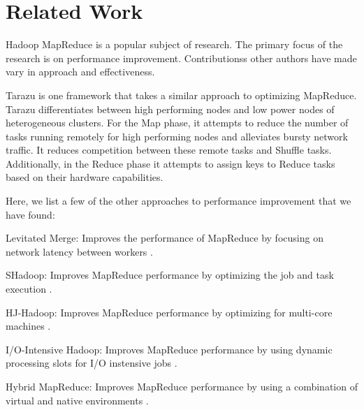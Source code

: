 \section{Related Work}
\label{section:relatedwork}
Hadoop MapReduce is a popular subject of research. The primary focus of the research
is on performance improvement. Contributionss other authors have made vary in
approach and effectiveness.

Tarazu is one framework that takes a similar approach to optimizing MapReduce. Tarazu 
differentiates between high performing nodes and low power nodes of heterogeneous clusters.
For the Map phase, it attempts to reduce the number of tasks running remotely for high
performing nodes and alleviates bursty network traffic. It reduces competition between
these remote tasks and Shuffle tasks. Additionally, in the Reduce phase it attempts to
assign keys to Reduce tasks based on their hardware capabilities.

Here, we list a few of the other approaches to performance improvement that we have found:
\begin{description}
  \item{Levitated Merge:} Improves the performance of MapReduce by focusing on network latency between workers \cite{LevitatedMerge}.
  \item{SHadoop:} Improves MapReduce performance by optimizing the job and task execution \cite{SHadoop}.
  \item{HJ-Hadoop:} Improves MapReduce performance by optimizing for multi-core machines \cite{HJHadoop}.
  \item{I/O-Intensive Hadoop:} Improves MapReduce performance by using dynamic processing slots for I/O instensive jobs \cite{IOIntensiveHadoop}.
  \item{Hybrid MapReduce:} Improves MapReduce performance by using a combination of virtual and native environments \cite{HybridMR}.
\end{description}
